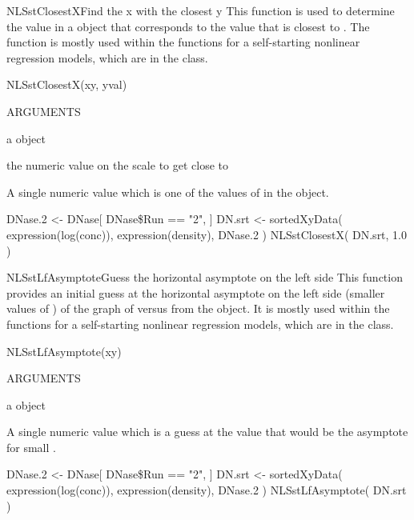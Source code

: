 \documentclass[pdftex]{article} \usepackage{url,graphicx}
\begin{document}
\begin{Helpfile}{NLSstClosestX}{Find the x with the closest y}
This function is used to determine the  value in a
 object that corresponds to the  value that
is closest to .  The function is mostly used within the
 functions for a self-starting nonlinear regression
models, which are in the  class.
\begin{Example}
NLSstClosestX(xy, yval)
\end{Example}
\begin{Argument}{ARGUMENTS}
\item[\Co{xy:}]
a  object
\item[\Co{yval:}]
the numeric value on the  scale to get close to
\end{Argument}
A single numeric value which is one of the values of  in the
 object.
\need 15pt
\vspace{-16pt}
\begin{Example}
DNase.2 <- DNase[ DNase\$Run == "2", ]
DN.srt <- sortedXyData( expression(log(conc)), expression(density), DNase.2 )
NLSstClosestX( DN.srt, 1.0 )
\end{Example}
\end{Helpfile}
\begin{Helpfile}{NLSstLfAsymptote}{Guess the horizontal asymptote on the left side}
This function provides an initial guess at the horizontal asymptote on
the left side (smaller values of ) of the graph of 
versus  from the  object.  It is mostly used within the
 functions for a self-starting nonlinear regression
models, which are in the  class.
\begin{Example}
NLSstLfAsymptote(xy)
\end{Example}
\begin{Argument}{ARGUMENTS}
\item[\Co{xy:}]
a  object
\end{Argument}
A single numeric value which is a guess at the  value that
would be the asymptote for small .
\need 15pt
\vspace{-16pt}
\begin{Example}
DNase.2 <- DNase[ DNase\$Run == "2", ]
DN.srt <- sortedXyData( expression(log(conc)), expression(density), DNase.2 )
NLSstLfAsymptote( DN.srt )
\end{Example}
\end{Helpfile}
\end{document}
